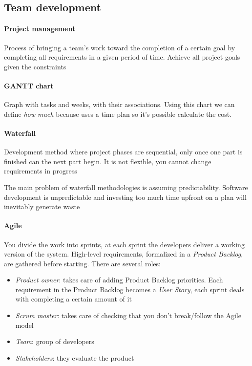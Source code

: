 \subsection{Team development}
\paragraph{Project management} 
Process of bringing a team's work toward the completion of a certain goal by completing all requirements in a given period of time. Achieve all project goals given the constraints

\paragraph{GANTT chart} 
Graph with tasks and weeks, with their associations. Using this chart we can define \textit{how much} because uses a time plan so it's possible calculate the cost.

\paragraph{Waterfall} 
Development method where project phases are sequential, only once one part is finished can the next part begin. It is not flexible, you cannot change requirements in progress

The main problem of waterfall methodologies is assuming predictability. Software development is unpredictable and investing too much time upfront on a plan will inevitably generate waste

\paragraph{Agile} 
You divide the work into sprints, at each sprint the developers deliver a working version of the system.
High-level requirements, formalized in a \textit{Product Backlog}, are gathered before starting. There are several roles:
\begin{itemize}
    \item \textit{Product owner}: takes care of adding Product Backlog priorities. Each requirement in the Product Backlog becomes a \textit{User Story}, each sprint deals with completing a certain amount of it
    \item \textit{Scrum master}: takes care of checking that you don't break/follow the Agile model
    \item \textit{Team}: group of developers
    \item \textit{Stakeholders}: they evaluate the product
\end{itemize}

\newpage